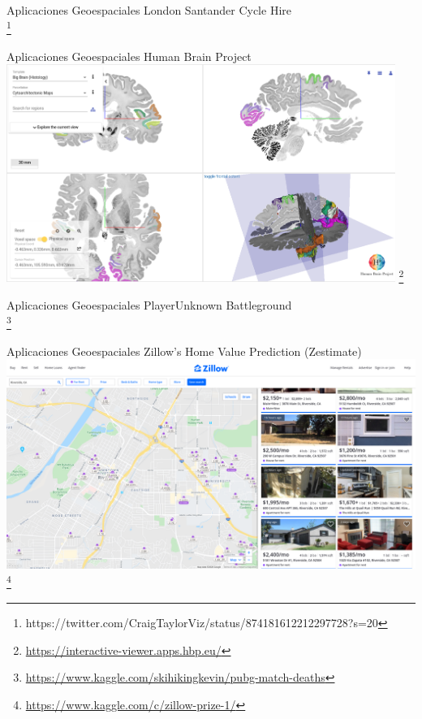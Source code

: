 \documentclass{beamer}
\newcommand\blfootnote[1]{%
  \begingroup
  \renewcommand\thefootnote{}\footnote{#1}%
  \addtocounter{footnote}{-1}%
  \endgroup
}
\begin{document}
\begin{frame}{Aplicaciones Geoespaciales}
    London Santander Cycle Hire 
    \centering
    \\
    \blfootnote{https://twitter.com/CraigTaylorViz/status/874181612212297728?s=20}
\end{frame}

\begin{frame}{Aplicaciones Geoespaciales}
    Human Brain Project
    \centering
    \includegraphics[width=0.95\textwidth]{figures/brain}
    \blfootnote{\url{https://interactive-viewer.apps.hbp.eu/}}
\end{frame}

\begin{frame}{Aplicaciones Geoespaciales}
    PlayerUnknown Battleground \hspace{2cm}
    \centering
    \\
    \blfootnote{\url{https://www.kaggle.com/skihikingkevin/pubg-match-deaths}}
\end{frame}

\begin{frame}{Aplicaciones Geoespaciales}
    Zillow’s Home Value Prediction (Zestimate) 
    \centering
    \includegraphics[width=\textwidth]{figures/zillow}\\
    \blfootnote{\url{https://www.kaggle.com/c/zillow-prize-1/}}
\end{frame}
\end{document}
